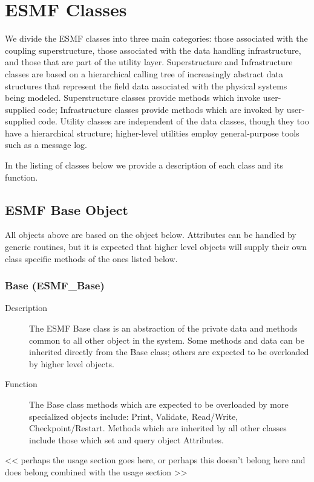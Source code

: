 \section{ESMF Classes}

We divide the ESMF classes into three main categories: those associated 
with the coupling superstructure, those associated with the data handling
infrastructure, and those that are part of the utility layer.  
Superstructure and Infrastructure
classes are based on a hierarchical 
calling tree of increasingly abstract data structures that represent the field data associated 
with the physical systems being modeled.  
Superstructure classes provide methods which invoke user-supplied code;
Infrastructure classes provide methods which are invoked by
user-supplied code.
Utility classes are independent 
of the data classes, though they too have a hierarchical structure; 
higher-level utilities employ general-purpose tools such as a message log.

In the listing of classes below we provide a description of each class and its function.

\subsection{ESMF Base Object}

All objects above are based on the object below.  Attributes
can be handled by generic routines, but it is expected that 
higher level objects will supply their own class specific
methods of the ones listed below.


\subsubsection{Base (ESMF\_Base)}
\label{sec:Base} 
\begin{description}
\item [Description] The ESMF Base class is an abstraction of the private data and
methods common to all other object in the system.  Some methods and data can be
inherited directly from the Base class; others are expected to be overloaded by
higher level objects.
\item [Function] The Base class methods which are expected to be overloaded by
more specialized objects include: Print, Validate, Read/Write, Checkpoint/Restart.
Methods which are inherited by all other classes include those which 
set and query object Attributes.
\end{description}

<< perhaps the usage section goes here, or perhaps this doesn't
belong here and does belong combined with the usage section >>







